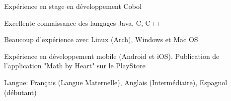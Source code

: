 \begin{cvitems}
\item{Expérience en stage en développement Cobol}
\item{Excellente connaissance des langages Java, C, C++}
\item{Beaucoup d'expérience avec Linux (Arch), Windows et Mac OS}
\item{Expérience en développement mobile (Android et iOS). Publication de l'application "Math by Heart" sur le PlayStore}
\item{Langue: Français (Langue Maternelle), Anglais (Intermédiaire), Espagnol (débutant)}
\end{cvitems}
